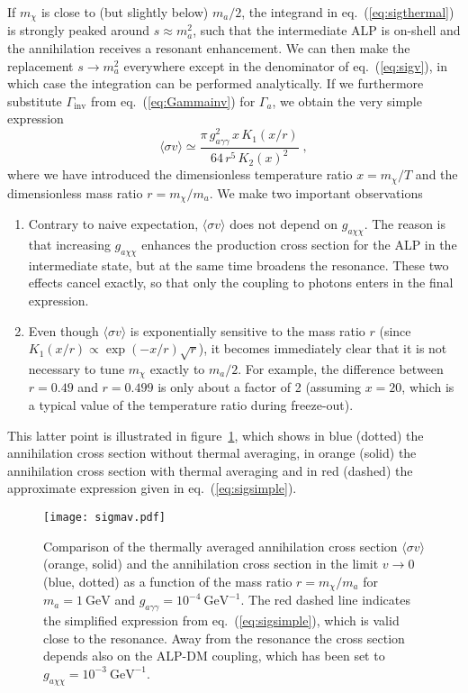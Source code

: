 \documentclass[11pt,a4paper]{article}
\newcommand{\ga}{g_{a\gamma\gamma}}
\begin{document}
If $m_\chi$ is close to (but slightly below) $m_a / 2$, the integrand in eq.~(\ref{eq:sigthermal}) is strongly peaked around $s \approx m_a^2$, such that the intermediate ALP is on-shell and the annihilation receives a resonant enhancement. We can then make the replacement $s \to m_a^2$ everywhere except in the denominator of eq.~(\ref{eq:sigv}), in which case the integration can be performed analytically. If we furthermore substitute $\Gamma_\text{inv}$ from eq.~(\ref{eq:Gammainv}) for $\Gamma_a$, we obtain the very simple expression
\begin{equation}
\langle \sigma v \rangle \simeq \frac{\pi \, \ga^2 \, x \, K_1(x/r)}{64 \, r^5 \, K_2(x)^2} \; , \label{eq:sigsimple}
\end{equation}
where we have introduced the dimensionless temperature ratio $x = m_\chi / T$ and the dimensionless mass ratio $r = m_\chi / m_a$. We make two important observations
\begin{enumerate}
 \item Contrary to naive expectation, $\langle \sigma v \rangle$ does not depend on $g_{a\chi\chi}$. The reason is that increasing $g_{a\chi\chi}$ enhances the production cross section for the ALP in the intermediate state, but at the same time broadens the resonance. These two effects cancel exactly, so that only the coupling to photons enters in the final expression.
 \item Even though $\langle \sigma v \rangle$ is exponentially sensitive to the mass ratio $r$ (since $K_1(x/r) \propto \exp(-x/r) \sqrt{r}$), it becomes immediately clear that it is not necessary to tune $m_\chi$ exactly to $m_a / 2$. For example, the difference between $r = 0.49$ and $r = 0.499$ is only about a factor of 2 (assuming $x = 20$, which is a typical value of the temperature ratio during freeze-out).
\end{enumerate}
This latter point is illustrated in figure~\ref{fig:sigmav}, which shows in blue (dotted) the annihilation cross section without thermal averaging, in orange (solid) the annihilation cross section with thermal averaging and in red (dashed) the approximate expression given in eq.~(\ref{eq:sigsimple}).

\begin{figure}
\centering
\texttt{[image: sigmav.pdf]}
\caption{\label{fig:sigmav} Comparison of the thermally averaged annihilation cross section $\langle \sigma v \rangle$ (orange, solid) and the annihilation cross section in the limit $v \to 0$ (blue, dotted) as a function of the mass ratio $r = m_\chi / m_a$ for $m_a = 1 \: \mathrm{GeV}$ and $\ga = 10^{-4}\:\mathrm{GeV}^{-1}$. The red dashed line indicates the simplified expression from eq.~(\ref{eq:sigsimple}), which is valid close to the resonance. Away from the resonance the cross section depends also on the ALP-DM coupling, which has been set to $g_{a\chi\chi} = 10^{-3}\:\mathrm{GeV}^{-1}$.}
\end{figure}
\end{document}
